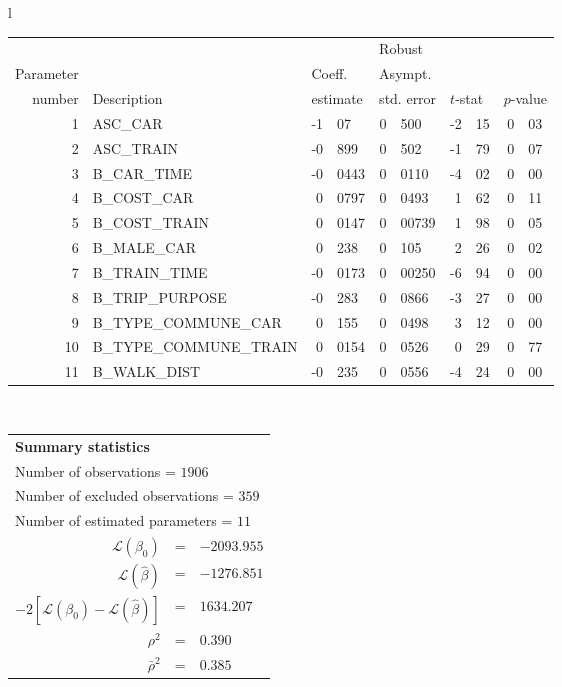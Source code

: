   \begin{tabular}{l}
\begin{tabular}{rlr@{.}lr@{.}lr@{.}lr@{.}l}
         &                       &   \multicolumn{2}{l}{}    & \multicolumn{2}{l}{Robust}  &     \multicolumn{4}{l}{}   \\
Parameter &                       &   \multicolumn{2}{l}{Coeff.}      & \multicolumn{2}{l}{Asympt.}  &     \multicolumn{4}{l}{}   \\
number &  Description                     &   \multicolumn{2}{l}{estimate}      & \multicolumn{2}{l}{std. error}  &   \multicolumn{2}{l}{$t$-stat}  &   \multicolumn{2}{l}{$p$-value}   \\

\hline

1 & ASC_CAR & -1&07 & 0&500 & -2&15 & 0&03\\
2 & ASC_TRAIN & -0&899 & 0&502 & -1&79 & 0&07\\
3 & B_CAR_TIME & -0&0443 & 0&0110 & -4&02 & 0&00\\
4 & B_COST_CAR & 0&0797 & 0&0493 & 1&62 & 0&11\\
5 & B_COST_TRAIN & 0&0147 & 0&00739 & 1&98 & 0&05\\
6 & B_MALE_CAR & 0&238 & 0&105 & 2&26 & 0&02\\
7 & B_TRAIN_TIME & -0&0173 & 0&00250 & -6&94 & 0&00\\
8 & B_TRIP_PURPOSE & -0&283 & 0&0866 & -3&27 & 0&00\\
9 & B_TYPE_COMMUNE_CAR & 0&155 & 0&0498 & 3&12 & 0&00\\
10 & B_TYPE_COMMUNE_TRAIN & 0&0154 & 0&0526 & 0&29 & 0&77\\
11 & B_WALK_DIST & -0&235 & 0&0556 & -4&24 & 0&00\\
\hline
\end{tabular}
\\
\begin{tabular}{rcl}
\multicolumn{3}{l}{\bf Summary statistics}\\
\multicolumn{3}{l}{ Number of observations = $1906$} \\
\multicolumn{3}{l}{ Number of excluded observations = $359$} \\
\multicolumn{3}{l}{ Number of estimated  parameters = $11$} \\
 $\mathcal{L}(\beta_0)$ &=&  $-2093.955$ \\
 $\mathcal{L}(\hat{\beta})$ &=& $-1276.851 $  \\
 $-2[\mathcal{L}(\beta_0) -\mathcal{L}(\hat{\beta})]$ &=& $1634.207$ \\
    $\rho^2$ &=&   $0.390$ \\
    $\bar{\rho}^2$ &=&    $0.385$ \\
\end{tabular}
  \end{tabular}
